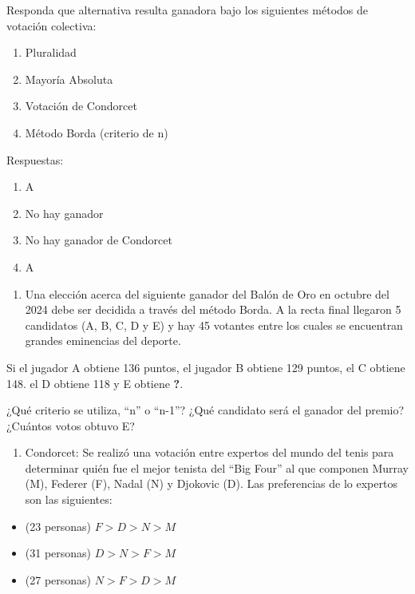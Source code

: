 \documentclass[
  letterpaper,
  DIV=11,
  numbers=noendperiod]{scrartcl}
\providecommand{\tightlist}{%
  \setlength{\itemsep}{0pt}\setlength{\parskip}{0pt}}
\begin{document}
Responda que alternativa resulta ganadora bajo los siguientes métodos de
votación colectiva:

\begin{enumerate}
\def\labelenumi{\alph{enumi})}
\tightlist
\item
  Pluralidad
\item
  Mayoría Absoluta
\item
  Votación de Condorcet
\item
  Método Borda (criterio de n)
\end{enumerate}

Respuestas:

\begin{enumerate}
\def\labelenumi{\alph{enumi})}
\tightlist
\item
  A
\item
  No hay ganador
\item
  No hay ganador de Condorcet
\item
  A
\end{enumerate}

\hfill\break

\begin{enumerate}
\def\labelenumi{\arabic{enumi})}
\setcounter{enumi}{1}
\tightlist
\item
  Una elección acerca del siguiente ganador del Balón de Oro en octubre
  del 2024 debe ser decidida a través del método Borda. A la recta final
  llegaron 5 candidatos (A, B, C, D y E) y hay 45 votantes entre los
  cuales se encuentran grandes eminencias del deporte.
\end{enumerate}

Si el jugador A obtiene 136 puntos, el jugador B obtiene 129 puntos, el
C obtiene 148. el D obtiene 118 y E obtiene \textbf{?}.

¿Qué criterio se utiliza, ``n'' o ``n-1''? ¿Qué candidato será el
ganador del premio? ¿Cuántos votos obtuvo E?

\hfill\break

\begin{enumerate}
\def\labelenumi{\arabic{enumi})}
\setcounter{enumi}{2}
\tightlist
\item
  Condorcet: Se realizó una votación entre expertos del mundo del tenis
  para determinar quién fue el mejor tenista del ``Big Four'' al que
  componen Murray (M), Federer (F), Nadal (N) y Djokovic (D). Las
  preferencias de lo expertos son las siguientes:
\end{enumerate}

\begin{itemize}
\tightlist
\item
  (23 personas) \(F>D>N>M\)
\item
  (31 personas) \(D>N>F>M\)
\item
  (27 personas) \(N>F>D>M\)
\end{itemize}
\end{document}
